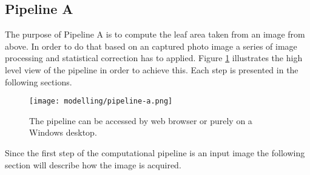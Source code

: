 \subsection{Pipeline A}\label{subsec:pipeline-a}

The purpose of Pipeline A is to compute the leaf area taken from an image from above.
In order to do that based on an captured photo image a series of image processing and
statistical correction has to applied. Figure \ref{fig:p:a} illustrates the high level
view of the pipeline in order to achieve this. Each step is presented in the following sections.

\begin{figure}[H]
    \centering
    \texttt{[image: modelling/pipeline-a.png]}
    \caption{The pipeline can be accessed by web browser or purely on a Windows desktop.}
    \label{fig:p:a}
\end{figure}

Since the first step of the computational pipeline is an input image the following section
will describe how the image is acquired.



